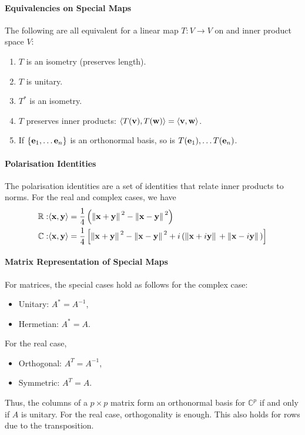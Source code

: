 \paragraph{Equivalencies on Special Maps}
The following are all equivalent for a linear map \( T: V \to V \) on
and inner product space \( V \):
\begin{enumerate}
    \item \( T \) is an isometry (preserves length).
    \item \( T \) is unitary.
    \item \( T^* \) is an isometry.
    \item \( T \) preserves inner products: \( \langle T(\mathbf{v}), T(\mathbf{w}) \rangle = \langle \mathbf{v}, \mathbf{w} \rangle \).
    \item If \( \left\{ \mathbf{e}_1, \dots \mathbf{e}_n \right\} \) is an orthonormal basis,
        so is \( T(\mathbf{e}_1),\dots T(\mathbf{e}_n) \).
\end{enumerate}

\paragraph{Polarisation Identities}
The polarisation identities are a set of identities that relate inner products
to norms. For the real and complex cases, we have
\begin{align*}
    \mathbb{R}:& \langle \mathbf{x}, \mathbf{y} \rangle = \frac{1}{4}\left(
        \norm*{\mathbf{x} + \mathbf{y}}^2 - \norm*{\mathbf{x} - \mathbf{y}}^2
    \right) \\
    \mathbb{C}:& \langle \mathbf{x}, \mathbf{y} \rangle = \frac{1}{4}\left[
        \norm*{\mathbf{x} + \mathbf{y}}^2 - \norm*{\mathbf{x} - \mathbf{y}}^2
        + i \left(\norm*{\mathbf{x} + i\mathbf{y}} + \norm*{\mathbf{x} -i\mathbf{y}} \right)
    \right]
\end{align*} 

\paragraph{Matrix Representation of Special Maps}
For matrices, the special cases hold as follows for the complex case:
\begin{itemize}
    \item Unitary: \( A^* = A^{-1} \),
    \item Hermetian: \( A^* = A \).
\end{itemize}
For the real case,
\begin{itemize}
    \item Orthogonal: \( A^T = A^{-1} \),
    \item Symmetric: \( A^T = A \).
\end{itemize}
Thus, the columns of a \( p\times p \) matrix form an orthonormal basis
for \( \mathbb{C}^p \) if and only if \( A \) is unitary.
For the real case, orthogonality is enough.
This also holds for rows due to the transposition.

